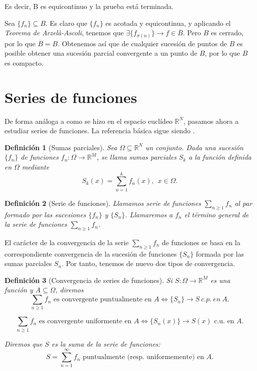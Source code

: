 \documentclass[11pt, a4paper]{article}
\makeatletter
\newif\IfInSansMode
\let\oldsf\sffamily
\renewcommand*{\sffamily}{\oldsf\mathversion{sans}\InSansModetrue}
\let\oldnorm\normalfont
\renewcommand*{\normalfont}{\oldnorm\InSansModefalse\mathversion{normal}}
\newcommand{\fn}{\{f_n\}}
\renewenvironment{proof}[1][\proofname] {\par\pushQED{\qed}\normalfont\topsep6\p@\@plus6\p@\relax\trivlist\item[\hskip\labelsep\itshape\sffamily#1\@addpunct{.}]\ignorespaces}{\popQED\endtrivlist\@endpefalse}
\theoremstyle{theorem-style}
\theoremstyle{definition-style}
\newtheorem{ndef}{Definición}[section]
\theoremstyle{remark-style}
\theoremstyle{example-style}
\makeatother
\begin{document}
\begin{proof}
    Es decir, B es equicontinuo y la prueba está terminada.

    \boxed{\Leftarrow} Sea $\fn \subseteq B$. Es claro que $\fn$ es acotada y equicontinua, y aplicando el \textit{Teorema de Arzelà-Ascoli}, tenemos que $\exists \{f_{\sigma(n)}\} \to f \in \overline{B}$. Pero $B$ es cerrado, por lo que $\overline{B} = B$. Obtenemos así que de cualquier sucesión de puntos de $B$ es posible obtener una sucesión parcial convergente a un punto de $B$, por lo que $B$ es compacto.
  \end{proof}

\newpage



\section{Series de funciones}

De forma análoga a como se hizo en el espacio euclídeo $\mathbb{R}^N$, pasamos ahora a estudiar series de funciones. La referencia básica sigue siendo \cite[Capítulo 5]{marsden}.

\begin{ndef}[Sumas parciales]
  Sea $\Omega\subseteq \mathbb R^N$ un conjunto. 
  Dada una sucesi\'on $\{f_n \}$ de funciones $f_n : \Omega \longrightarrow \mathbb R^M$, se llama sumas parciales $S_k$ a la funci\'on definida en $\Omega$ mediante
  \[ 
    S_k (x) = \sum_{n=1}^{k} f_n(x),\ \ x\in\Omega.
  \] 
\end{ndef}

\begin{ndef}[Serie de funciones]
  Llamamos serie  de funciones $\sum_{n\geq 1} f_n$ al par formado por las sucesiones  $\{ f_n \}$ y $\{S_n\}$. Llamaremos a $f_n$ el t\'ermino general de la serie de funciones $\displaystyle\sum_{n\geq 1} f_n$.
\end{ndef}


El car\'acter de la convergencia de la serie $\sum_{n\geq 1} f_n$ de funciones se basa en la correspondiente convergencia de la sucesi\'on de funciones $\{S_n\}$ formada por las sumas parciales $S_n$. Por tanto, tenemos de nuevo dos tipos de convergencia.
\begin{ndef}[Convergencia de series de funciones]
  Si $S:\Omega\longrightarrow \mathbb R^M$ es una funci\'on y $A\subseteq \Omega$, diremos 
  $$\sum_{n\geq 1} f_n  \mbox{ es convergente puntualmente en } A \Leftrightarrow \{S_n \} \longrightarrow S\ c.p.\ en\ A.$$

  $$\sum_{n\geq 1} f_n  \mbox{ es convergente uniformente en }A \Leftrightarrow \{S_n(x)\} \longrightarrow S(x) \mbox{ c.u. en }A.$$ 

  Diremos que $S$ es la suma de la serie de funciones: 
  \[
    S=\displaystyle \sum_{n=1}^{\infty} f_n \mbox{ puntualmente (resp. uniformemente) en $A$.}
  \]
\end{ndef}
\end{document}
